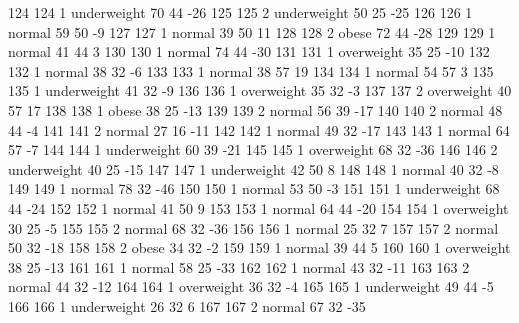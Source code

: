 \begin{Schunk}
\begin{Soutput}
124         124   1 underweight  70         44          -26
125         125   2 underweight  50         25          -25
126         126   1      normal  59         50           -9
127         127   1      normal  39         50           11
128         128   2       obese  72         44          -28
129         129   1      normal  41         44            3
130         130   1      normal  74         44          -30
131         131   1  overweight  35         25          -10
132         132   1      normal  38         32           -6
133         133   1      normal  38         57           19
134         134   1      normal  54         57            3
135         135   1 underweight  41         32           -9
136         136   1  overweight  35         32           -3
137         137   2  overweight  40         57           17
138         138   1       obese  38         25          -13
139         139   2      normal  56         39          -17
140         140   2      normal  48         44           -4
141         141   2      normal  27         16          -11
142         142   1      normal  49         32          -17
143         143   1      normal  64         57           -7
144         144   1 underweight  60         39          -21
145         145   1  overweight  68         32          -36
146         146   2 underweight  40         25          -15
147         147   1 underweight  42         50            8
148         148   1      normal  40         32           -8
149         149   1      normal  78         32          -46
150         150   1      normal  53         50           -3
151         151   1 underweight  68         44          -24
152         152   1      normal  41         50            9
153         153   1      normal  64         44          -20
154         154   1  overweight  30         25           -5
155         155   2      normal  68         32          -36
156         156   1      normal  25         32            7
157         157   2      normal  50         32          -18
158         158   2       obese  34         32           -2
159         159   1      normal  39         44            5
160         160   1  overweight  38         25          -13
161         161   1      normal  58         25          -33
162         162   1      normal  43         32          -11
163         163   2      normal  44         32          -12
164         164   1  overweight  36         32           -4
165         165   1 underweight  49         44           -5
166         166   1 underweight  26         32            6
167         167   2      normal  67         32          -35

\end{Soutput}
\end{Schunk}
